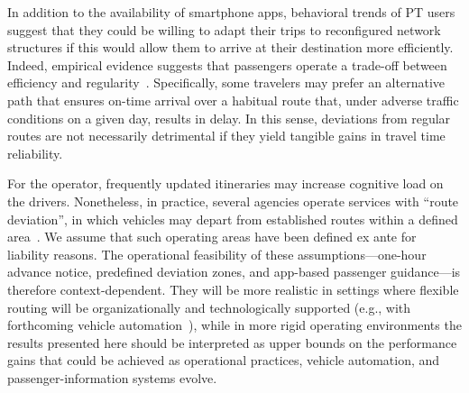 \documentclass[a4paper,fleqn]{cas-sc}
\begin{document}
%
In addition to the availability of smartphone apps, behavioral trends of PT users suggest that they could be willing to adapt their trips to reconfigured network structures if this would allow them to arrive at their destination more efficiently.
Indeed, empirical evidence suggests that passengers operate a trade-off between efficiency and regularity~\citep{devarasetty2012value}. Specifically, some travelers may prefer an alternative path that ensures on-time arrival over a habitual route that, under adverse traffic conditions on a given day, results in delay. In this sense, deviations from regular routes are not necessarily detrimental if they yield tangible gains in travel time reliability. 

For the operator, frequently updated itineraries may increase cognitive load on the drivers.
Nonetheless, in practice, several agencies operate services with ``route deviation'', in which vehicles may depart from established routes within a defined area~\citep{NationalRTAP_ADA_Toolkit_2024}.  We assume that such operating areas have been defined ex ante for liability reasons.
The operational feasibility of these assumptions—one-hour advance notice, predefined deviation zones, and app-based passenger guidance—is therefore context-dependent. They will be more realistic in settings where flexible routing will be organizationally and technologically supported (e.g., with forthcoming vehicle automation~\citep{Peled2019}), while in more rigid operating environments the results presented here should be interpreted as upper bounds on the performance gains that could be achieved as operational practices, vehicle automation, and passenger-information systems evolve.
\end{document}
